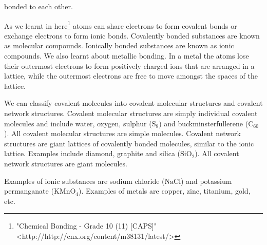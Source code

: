 bonded to each other.\par 
      \label{m38120*eip-819}As we learnt in  here\footnote{\raggedright{}"Chemical Bonding - Grade 10 (11) [CAPS]" <http://http://cnx.org/content/m38131/latest/>} atoms can share electrons to form covalent bonds or exchange electrons to form ionic bonds. Covalently bonded substances are known as molecular compounds. Ionically bonded substances are known as ionic compounds. We also learnt about metallic bonding. In a metal the atoms lose their outermost electrons to form positively charged ions that are arranged in a lattice, while the outermost electrons are free to move amongst the spaces of the lattice. \par \label{m38120*eip-394}We can classify covalent molecules into covalent molecular structures and covalent network structures. Covalent molecular structures are simply individual covalent molecules and include water, oxygen, sulphur (${\mathrm{S}}_{8}$) and buckminsterfullerene (${\mathrm{C}}_{60}$). All covalent molecular structures are simple molecules. Covalent network structures are giant lattices of covalently bonded molecules, similar to the ionic lattice. Examples include diamond, graphite and silica (${\mathrm{SiO}}_{2}$). All covalent network structures are giant molecules.\par \label{m38120*eip-860}Examples of ionic substances are sodium chloride ($\mathrm{NaCl}$) and potassium permanganate (${\mathrm{KMnO}}_{4}$). Examples of metals are copper, zinc, titanium, gold, etc.\par \label{m38120*uid1}
